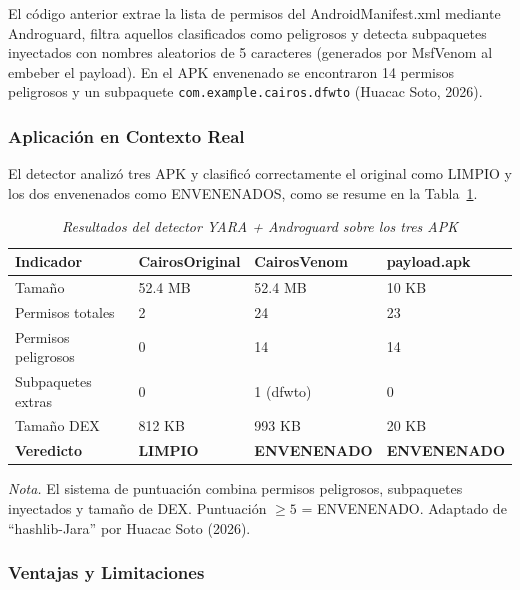 \documentclass[12pt,a4paper]{article}
\begin{document}
El código anterior extrae la lista de permisos del AndroidManifest.xml
mediante Androguard, filtra aquellos clasificados como peligrosos y
detecta subpaquetes inyectados con nombres aleatorios de 5 caracteres
(generados por MsfVenom al embeber el payload). En el APK envenenado se
encontraron 14 permisos peligrosos y un subpaquete
\texttt{com.example.cairos.dfwto} (Huacac Soto, 2026).

\subsubsection{Aplicación en Contexto Real}

El detector analizó tres APK y clasificó correctamente el original como
LIMPIO y los dos envenenados como ENVENENADOS, como se resume en la
Tabla~\ref{tab:resultados_deteccion}.

\begin{table}[H]
\centering
\begin{threeparttable}
\caption{\textit{Resultados del detector YARA + Androguard sobre los tres APK}}
\label{tab:resultados_deteccion}
\begin{tabular}{p{3.5cm}p{3cm}p{3cm}p{3cm}}
\toprule
\textbf{Indicador} & \textbf{CairosOriginal} & \textbf{CairosVenom} & \textbf{payload.apk} \\
\midrule
Tamaño & 52.4 MB & 52.4 MB & 10 KB \\
Permisos totales & 2 & 24 & 23 \\
Permisos peligrosos & 0 & 14 & 14 \\
Subpaquetes extras & 0 & 1 (dfwto) & 0 \\
Tamaño DEX & 812 KB & 993 KB & 20 KB \\
\textbf{Veredicto} & \textbf{LIMPIO} & \textbf{ENVENENADO} & \textbf{ENVENENADO} \\
\bottomrule
\end{tabular}
\begin{tablenotes}
\item \textit{Nota.} El sistema de puntuación combina permisos peligrosos, subpaquetes inyectados y tamaño de DEX. Puntuación $\geq 5$ = ENVENENADO. Adaptado de \enquote{hashlib-Jara} por Huacac Soto (2026).
\end{tablenotes}
\end{threeparttable}
\end{table}

\subsubsection{Ventajas y Limitaciones}
\end{document}
